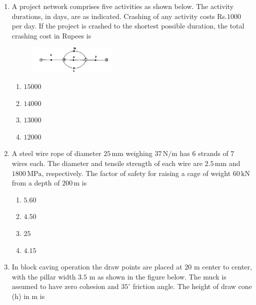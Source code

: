 \documentclass[journal,12pt,onecolumn]{IEEEtran}
\theoremstyle{remark}
\begin{document}
\begin{enumerate}
\item A project network comprises five activities as shown below. The activity durations, in days, are as
indicated. Crashing of any activity costs Rs.$1000$ per day. If the project is crashed to the shortest possible duration, the total crashing cost in Rupees is

\hfill{}
\begin{figure}[H]
\centering
\includegraphics[width=0.4\textwidth]{figs/43.png}
\end{figure}
\begin{multicols}{4}
\begin{enumerate}
\item $15000$
\item $14000$
\item $13000$
\item $ 12000$
\end{enumerate}
\end{multicols}

\item A steel wire rope of diameter $25\,\mathrm{mm}$ weighing $37\,\mathrm{N/m}$ has $6$ strands of $7$ wires each. 
The diameter and tensile strength of each wire are $2.5\,\mathrm{mm}$ and $1800\,\mathrm{MPa}$, respectively. The factor of safety for raising a cage of weight $60\,\mathrm{kN}$ from a depth of $200\,\mathrm{m}$ is

\hfill{}
\begin{multicols}{4}
\begin{enumerate}
\item $5.60$
\item $4.50$
\item $25$
\item $4.15$
\end{enumerate}
\end{multicols}

\item In block caving operation the draw points are placed at $20$ m center to center, with the pillar width
$3.5$ m as shown in the figure below. The muck is assumed to have zero cohesion and $35^\circ$ friction angle. The height of draw cone (h) in m is


\end{enumerate}
\end{document}
